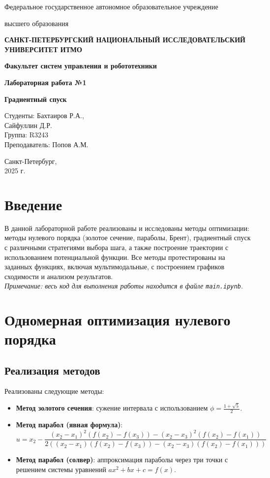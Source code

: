 \documentclass[a4paper,12pt]{article}
\begin{document}
    

\begin{titlepage}
    \centering
    {\large Федеральное государственное автономное образовательное учреждение\par}
    {\large высшего образования\par}
    {\bfseries САНКТ-ПЕТЕРБУРГСКИЙ НАЦИОНАЛЬНЫЙ ИССЛЕДОВАТЕЛЬСКИЙ УНИВЕРСИТЕТ ИТМО\par}
    {\bfseries Факультет систем управления и робототехники\par}
    \vfill
    {\Large \bfseries Лабораторная работа №1\par}
    {\Large \bfseries Градиентный спуск \par}
    \vfill
    
    \begin{flushright}
        Студенты: Бахтаиров Р.А.,\\ Сайфуллин Д.Р. \\
        Группа:  R3243\\
        Преподаватель: Попов А.М.
    \end{flushright}
    \vfill
    Санкт-Петербург,\\ 
    2025 г.
\end{titlepage}

\section{Введение}
В данной лабораторной работе реализованы и исследованы методы оптимизации: методы нулевого порядка (золотое сечение, параболы, Брент), градиентный спуск с различными стратегиями выбора шага, а также построение траектории с использованием потенциальной функции. Все методы протестированы на заданных функциях, включая мультимодальные, с построением графиков сходимости и анализом результатов. \\[0.5em]
\textit{Примечание: весь код для выполнения работы находится в файле \texttt{main.ipynb}.}
\section{Одномерная оптимизация нулевого порядка}

\subsection{Реализация методов}
Реализованы следующие методы:
\begin{itemize}
    \item \textbf{Метод золотого сечения}: сужение интервала с использованием $\phi = \frac{1 + \sqrt{5}}{2}$.
    \item \textbf{Метод парабол (явная формула)}:
    \[
    u = x_2 - \frac{(x_2 - x_1)^2 (f(x_2) - f(x_3)) - (x_2 - x_3)^2 (f(x_2) - f(x_1))}{2 \left( (x_2 - x_1) (f(x_2) - f(x_3)) - (x_2 - x_3) (f(x_2) - f(x_1)) \right)}
    \]
    \item \textbf{Метод парабол (солвер)}: аппроксимация параболы через три точки с решением системы уравнений $ax^2 + bx + c = f(x)$.
\end{itemize}
\end{document}
